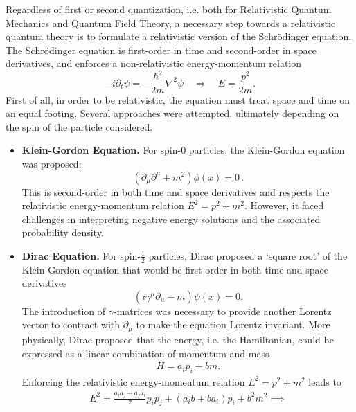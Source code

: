 \documentclass[../QFT_main.tex]{subfiles}
\begin{document}
\begin{mytheorem}
%
Regardless of first or second quantization, i.e. both for Relativistic Quantum Mechanics and Quantum Field Theory, a necessary step towards a relativistic quantum theory is to formulate a relativistic version of the Schr\"odinger equation.
The Schr\"odinger equation is first-order in time and second-order in space derivatives, and enforces a non-relativistic energy-momentum relation
{\small\begin{equation}
    -i\partial_t\psi = -\frac{\hbar^2}{2m} \nabla^2 \psi\quad \Longrightarrow\quad E = \frac{p^2}{2m}.
\end{equation}}
First of all, in order to be relativistic, the equation must treat space and time on an equal footing.
Several approaches were attempted, ultimately depending on the spin of the particle considered.
\begin{itemize}
    \item \textbf{Klein-Gordon Equation.} For spin-0 particles, the Klein-Gordon equation was proposed:
    \begin{equation}
        (\partial_{\mu} \partial^{\mu} + m^2) \phi(x) = 0\,.
    \end{equation}
    This is second-order in both time and space derivatives and respects the relativistic energy-momentum relation \(E^2 = p^2 + m^2\).
    However, it faced challenges in interpreting negative energy solutions and the associated probability density.
    \item \textbf{Dirac Equation.} For spin-$\tfrac{1}{2}$ particles, Dirac proposed a `square root' of the Klein-Gordon equation that would be first-order in both time and space derivatives
    \begin{equation}
        (i\gamma^{\mu} \partial_{\mu} - m) \psi(x) = 0.
    \end{equation}
    The introduction of $\gamma$-matrices was necessary to provide another Lorentz vector to contract with $\partial_{\mu}$ to make the equation Lorentz invariant.
    More physically, Dirac proposed that the energy, i.e. the Hamiltonian, could be expressed as a linear combination of momentum and mass
    \begin{align}
        H= a_i p_i + b m .
    \end{align}
    Enforcing the relativistic energy-momentum relation $E^2 = p^2 + m^2$ leads to
    \begin{align}
        E^2 = \tfrac{a_ia_j+a_ja_i}{2}p_ip_j+ (a_ib+ba_i) p_i + b^2 m^2 \implies

\end{align}
\end{itemize}
\end{mytheorem}
\end{document}
